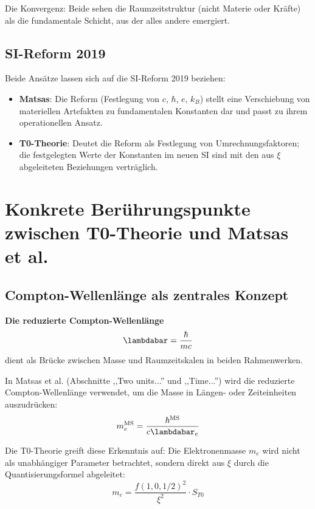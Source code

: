 	Die Konvergenz: Beide sehen die Raumzeitstruktur (nicht Materie oder Kräfte) als die fundamentale Schicht, aus der alles andere emergiert.
	
	\subsection{SI-Reform 2019}
	
	Beide Ansätze lassen sich auf die SI-Reform 2019 beziehen:
	
	\begin{itemize}
		\item \textbf{Matsas}: Die Reform (Festlegung von $c$, $\hbar$, $e$, $k_B$) stellt eine Verschiebung von materiellen Artefakten zu fundamentalen Konstanten dar und passt zu ihrem operationellen Ansatz.
		
		\item \textbf{T0-Theorie}: Deutet die Reform als Festlegung von Umrechnungsfaktoren; die festgelegten Werte der Konstanten im neuen SI sind mit den aus $\xi$ abgeleiteten Beziehungen verträglich.
	\end{itemize}
	
	\section{Konkrete Berührungspunkte zwischen T0-Theorie und Matsas et al.}
	
	\subsection{Compton-Wellenlänge als zentrales Konzept}
	
	\begin{keyresult}
		\textbf{Die reduzierte Compton-Wellenlänge}
		\[
		\lambdabar = \frac{\hbar}{m c}
		\]
		dient als Brücke zwischen Masse und Raumzeitskalen in beiden Rahmenwerken.
	\end{keyresult}
	
	In Matsas et al. (Abschnitte ,,Two units...'' und ,,Time...'') wird die reduzierte Compton-Wellenlänge verwendet, um die Masse in Längen- oder Zeiteinheiten auszudrücken:
	\[
	m_e^{\text{MS}} = \frac{\hbar^{\text{MS}}}{c \lambdabar_e}
	\]
	
	Die T0-Theorie greift diese Erkenntnis auf: Die Elektronenmasse $m_e$ wird nicht als unabhängiger Parameter betrachtet, sondern direkt aus $\xi$ durch die Quantisierungsformel abgeleitet:
	\[
	m_e = \frac{f(1,0,1/2)^2}{\xi^2} \cdot S_{T0}
	\]
	
